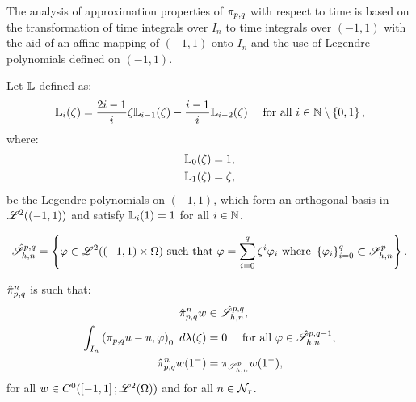 The analysis of approximation properties of $\pi_{p, q}$ with respect to time is based on the transformation of time integrals over $I_n$ to time integrals over $\left( -1, 1 \right)$ with the aid of an affine mapping of $\left( -1, 1 \right)$ onto $I_n$ and the use of Legendre polynomials defined on $\left( -1, 1 \right)$.

\begin{definition}
    Let $\mathbb{L}$ defined as:
    \begin{gather}
        \mathbb{L}_{i}(\zeta) = \frac{2i - 1}{i} \zeta \mathbb{L}_{i - 1}(\zeta) - \frac{i - 1}{i} \mathbb{L}_{i - 2}(\zeta) \quad \text{ for all } i \in \mathbb{N} \setminus \left\{ 0, 1 \right\},
    \end{gather}
    where:
    \begin{align}
        \mathbb{L}_{0}(\zeta) &= 1, \\
        \mathbb{L}_{1}(\zeta) &= \zeta,
    \end{align}
    be the Legendre polynomials on $\left( -1, 1 \right)$, which form an orthogonal basis in $\mathscr{L}^{2}(\left( -1, 1 \right))$ and satisfy $\mathbb{L}_i(1) = 1$ for all $i \in \mathbb{N}$.
\end{definition}

\begin{definition}[$\SpaceSolutionReference$]
    \begin{gather}
        \hat{\mathscr{S}}^{p, q}_{h, n} = \left\{ \varphi \in \mathscr{L}^{2}(\left( -1, 1 \right) \times \Omega) \text{ such that } \varphi = \sum_{i = 0}^q \zeta^i \varphi_i \text{ where } \left\{ \varphi_i \right\}_{i = 0}^q \subset \mathscr{S}_{h, n}^p \right\}.
    \end{gather}
\end{definition}

\begin{definition}[$\InterpolantPQR$] \label{definition:interpolant_ref_qp}
    $\InterpolantPQR$ is such that:
    \begin{align}
        \hat{\pi}_{p, q}^n w &\in \hat{\mathscr{S}}^{p, q}_{h, n}, \\
        \int_{I_n} \left( \pi_{p, q} u - u, \varphi \right)_0 ~ d \lambda(\zeta) &= 0 \quad \text{ for all } \varphi \in \hat{\mathscr{S}}^{p, q - 1}_{h, n}, \\
        \hat{\pi}_{p, q}^n w(1^-) &= \pi_{\mathscr{S}^p_{h, n}} w(1^-),
    \end{align}
    for all $w \in C^0(\left[ -1, 1 \right]; \mathscr{L}^{2}(\Omega))$ and for all $n \in \mathcal{N}_{\tau}$.
\end{definition}

